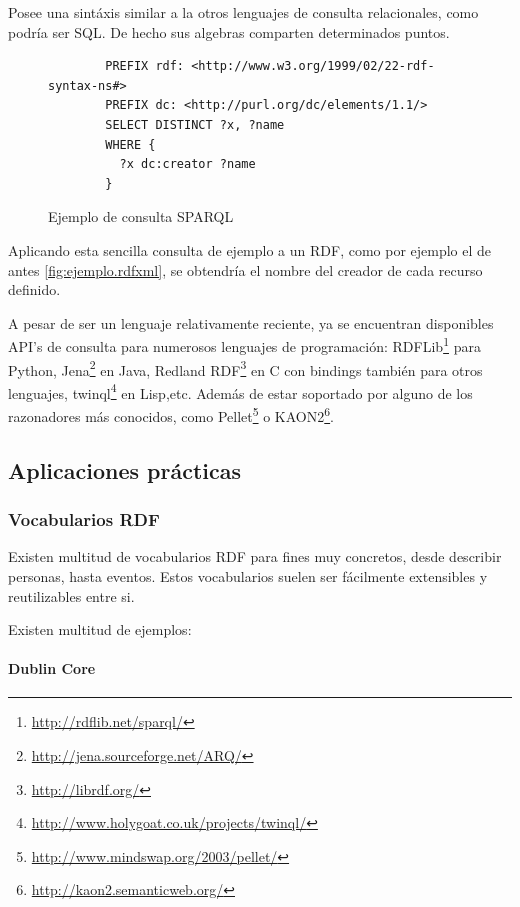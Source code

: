 Posee una sintáxis similar a la otros lenguajes de consulta relacionales, como
podría ser SQL. De hecho sus algebras comparten\cite{RelationalAlgebraSPARQL} 
determinados puntos. 

\begin{figure}[ht]
	\begin{verbatim}
		PREFIX rdf: <http://www.w3.org/1999/02/22-rdf-syntax-ns#>
		PREFIX dc: <http://purl.org/dc/elements/1.1/>
		SELECT DISTINCT ?x, ?name
		WHERE {
		  ?x dc:creator ?name
		}
	\end{verbatim}
	\centering
	\caption{Ejemplo de consulta SPARQL}
	\label{fig:ejemplo.sparql}
\end{figure}

Aplicando esta sencilla consulta de ejemplo a un RDF, como por ejemplo el de 
antes \ref{fig:ejemplo.rdfxml}, se obtendría el nombre del creador de cada recurso
definido.

A pesar de ser un lenguaje relativamente reciente, ya se encuentran disponibles
API's de consulta para numerosos lenguajes de programación: 
RDFLib\footnote{\url{http://rdflib.net/sparql/}} para Python, 
Jena\footnote{\url{http://jena.sourceforge.net/ARQ/}} en Java, 
Redland RDF\footnote{\url{http://librdf.org/}} en C con bindings también para 
otros lenguajes, twinql\footnote{\url{http://www.holygoat.co.uk/projects/twinql/}} 
en Lisp,etc. Además de estar soportado por alguno de los razonadores más conocidos, 
como Pellet\footnote{\url{http://www.mindswap.org/2003/pellet/}} o 
KAON2\footnote{\url{http://kaon2.semanticweb.org/}}.

\subsection{Aplicaciones prácticas}

\subsubsection{Vocabularios RDF}

Existen multitud de vocabularios RDF para fines muy concretos, desde describir
personas, hasta eventos. Estos vocabularios suelen ser fácilmente extensibles y 
reutilizables entre si.

Existen multitud de ejemplos:

\paragraph{Dublin Core\label{sec:dc}}

